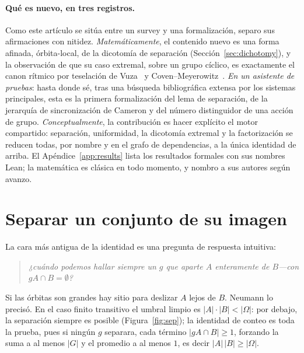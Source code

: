 \documentclass[11pt]{article}
\begin{document}
\paragraph{Qué es nuevo, en tres registros.} Como este artículo se sitúa entre un
survey y una formalización, separo sus afirmaciones con nitidez.
\emph{Matemáticamente}, el contenido nuevo es una forma afinada, órbita-local, de la
dicotomía de separación (Sección~\ref{sec:dichotomy}), y la observación de que su
caso extremal, sobre un grupo cíclico, es exactamente el canon rítmico por
teselación de Vuza~\cite{Vuza1991} y Coven--Meyerowitz~\cite{CovenMeyerowitz1999}.
\emph{En un asistente de pruebas}: hasta donde sé, tras una búsqueda bibliográfica
extensa por los sistemas principales, esta es la primera formalización del lema de
separación, de la jerarquía de sincronización de Cameron y del número distinguidor
de una acción de grupo. \emph{Conceptualmente}, la contribución es hacer explícito
el motor compartido: separación, uniformidad, la dicotomía extremal y la
factorización se reducen todas, por nombre y en el grafo de dependencias, a la única
identidad de arriba. El Apéndice~\ref{app:results} lista los resultados formales con
sus nombres Lean; la matemática es clásica en todo momento, y nombro a sus autores
según avanzo.



\section{Separar un conjunto de su imagen}
\label{sec:setting}

La cara más antigua de la identidad es una pregunta de respuesta intuitiva:
\begin{quote}\itshape
  ¿cuándo podemos hallar siempre un $g$ que aparte $A$ enteramente de $B$---con
  $gA\cap B=\emptyset$?
\end{quote}
Si las órbitas son grandes hay sitio para deslizar $A$ lejos de $B$. Neumann lo
precisó. En el caso finito transitivo el umbral limpio es $|A|\cdot|B|<|\Omega|$: por
debajo, la separación siempre es posible (Figura~\ref{fig:sep}); la identidad de
conteo es toda la prueba, pues si ningún $g$ separara, cada término $|gA\cap B|\ge1$,
forzando la suma a al menos $|G|$ y el promedio a al menos $1$, es decir
$|A|\,|B|\ge|\Omega|$.
\end{document}
